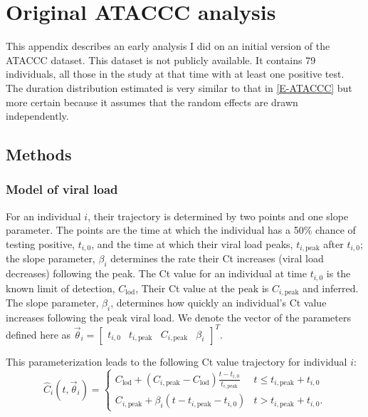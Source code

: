 \documentclass[thesis.tex]{subfiles}
\begin{document}
\chapter{Original ATACCC analysis} \label{ATACCC:sec:original-analysis}

This appendix describes an early analysis I did on an initial version of the ATACCC dataset.
This dataset is not publicly available.
It contains 79 individuals, all those in the study at that time with at least one positive test.
The duration distribution estimated is very similar to that in \cref{E-ATACCC} but more certain because it assumes that the random effects are drawn independently.

\section{Methods}

\subsection{Model of viral load}

For an individual $i$, their trajectory is determined by two points and one slope parameter.
The points are the time at which the individual has a 50\% chance of testing positive, $t_{i,0}$, and the time at which their viral load
peaks, $t_{i,\text{peak}}$ after $t_{i,0}$; the slope parameter, $\beta_i$ determines the rate their Ct increases (viral load decreases) following the peak.
The Ct value for an individual at time $t_{i,0}$ is the known limit of detection, $C_\text{lod}$,
Their Ct value at the peak is $C_{i,\text{peak}}$ and inferred.
The slope parameter, $\beta_i$, determines how quickly an individual's Ct value increases following the peak viral load.
We denote the vector of the parameters defined here as $\vec\theta_i = \begin{bmatrix} t_{i,0} & t_{i,\text{peak}} & C_{i,\text{peak}} &  \beta_i \end{bmatrix}^T$.

This parameterization leads to the following Ct value trajectory for individual $i$:
$$
\hat{C}_i(t, \vec\theta_i) = \begin{cases}
  C_{\text{lod}} + (C_{i,\text{peak}} - C_{\text{lod}}) \frac{t - t_{i,0}}{t_{i,\text{peak}}}
    &t \leq t_{i,\text{peak}} + t_{i,0} \\
  C_{i,\text{peak}} + \beta_i (t - t_{i,\text{peak}} - t_{i,0})
    &t > t_{i,\text{peak}} + t_{i,0}.
\end{cases}
$$
\end{document}
